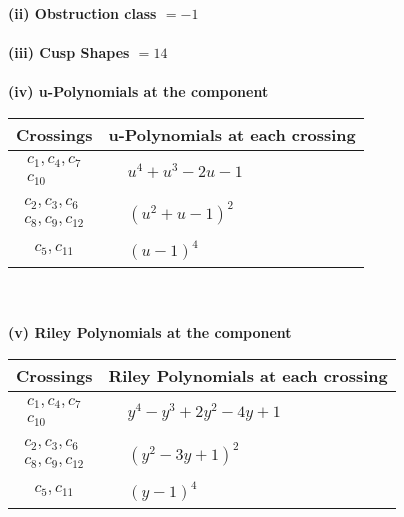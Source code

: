 \documentclass[1p]{elsarticle_modified}
\theoremstyle{definition}
\begin{document}
\flushleft \textbf{(ii) Obstruction class $= -1$}\\~\\
\flushleft \textbf{(iii) Cusp Shapes $= 14$}\\~\\
\newpage\renewcommand{\arraystretch}{1}
\flushleft \textbf{(iv) u-Polynomials at the component}\newline \\
\begin{tabular}{m{50pt}|m{274pt}}
Crossings & \hspace{64pt}u-Polynomials at each crossing \\
\hline $$\begin{aligned}c_{1},c_{4},c_{7}\\c_{10}\end{aligned}$$&$\begin{aligned}
&u^4+u^3-2 u-1
\end{aligned}$\\
\hline $$\begin{aligned}c_{2},c_{3},c_{6}\\c_{8},c_{9},c_{12}\end{aligned}$$&$\begin{aligned}
&(u^2+u-1)^2
\end{aligned}$\\
\hline $$\begin{aligned}c_{5},c_{11}\end{aligned}$$&$\begin{aligned}
&(u-1)^4
\end{aligned}$\\
\hline
\end{tabular}\\~\\
\newpage\renewcommand{\arraystretch}{1}
\flushleft \textbf{(v) Riley Polynomials at the component}\newline \\
\begin{tabular}{m{50pt}|m{274pt}}
Crossings & \hspace{64pt}Riley Polynomials at each crossing \\
\hline $$\begin{aligned}c_{1},c_{4},c_{7}\\c_{10}\end{aligned}$$&$\begin{aligned}
&y^4- y^3+2 y^2-4 y+1
\end{aligned}$\\
\hline $$\begin{aligned}c_{2},c_{3},c_{6}\\c_{8},c_{9},c_{12}\end{aligned}$$&$\begin{aligned}
&(y^2-3 y+1)^2
\end{aligned}$\\
\hline $$\begin{aligned}c_{5},c_{11}\end{aligned}$$&$\begin{aligned}
&(y-1)^4
\end{aligned}$\\
\hline
\end{tabular}\\~\\
\end{document}
